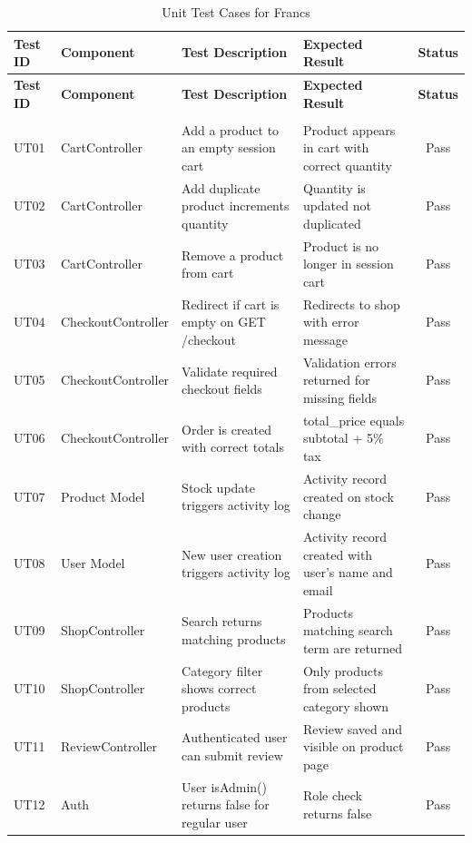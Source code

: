 \renewcommand{\arraystretch}{1.3}
\begin{longtable}{|p{1.5cm}|p{2.5cm}|p{4cm}|p{4cm}|c|}
    \hline
    \textbf{Test ID} & \textbf{Component} & \textbf{Test Description} & \textbf{Expected Result} & \textbf{Status} \\
    \hline
    \endfirsthead
    \hline
    \textbf{Test ID} & \textbf{Component} & \textbf{Test Description} & \textbf{Expected Result} & \textbf{Status} \\
    \hline
    \endhead
    \hline
    \endfoot
    \hline
    \caption{Unit Test Cases for Francs} \label{tab:unit_tests} \\
    \endlastfoot
    UT01 & CartController & \raggedright Add a product to an empty session cart & \raggedright Product appears in cart with correct quantity & Pass \\
    \hline
    UT02 & CartController & \raggedright Add duplicate product increments quantity & \raggedright Quantity is updated not duplicated & Pass \\
    \hline
    UT03 & CartController & \raggedright Remove a product from cart & \raggedright Product is no longer in session cart & Pass \\
    \hline
    UT04 & CheckoutController & \raggedright Redirect if cart is empty on GET /checkout & \raggedright Redirects to shop with error message & Pass \\
    \hline
    UT05 & CheckoutController & \raggedright Validate required checkout fields & \raggedright Validation errors returned for missing fields & Pass \\
    \hline
    UT06 & CheckoutController & \raggedright Order is created with correct totals & \raggedright total\_price equals subtotal + 5\% tax & Pass \\
    \hline
    UT07 & Product Model & \raggedright Stock update triggers activity log & \raggedright Activity record created on stock change & Pass \\
    \hline
    UT08 & User Model & \raggedright New user creation triggers activity log & \raggedright Activity record created with user's name and email & Pass \\
    \hline
    UT09 & ShopController & \raggedright Search returns matching products & \raggedright Products matching search term are returned & Pass \\
    \hline
    UT10 & ShopController & \raggedright Category filter shows correct products & \raggedright Only products from selected category shown & Pass \\
    \hline
    UT11 & ReviewController & \raggedright Authenticated user can submit review & \raggedright Review saved and visible on product page & Pass \\
    \hline
    UT12 & Auth & \raggedright User isAdmin() returns false for regular user & \raggedright Role check returns false & Pass \\
    \hline
\end{longtable}


